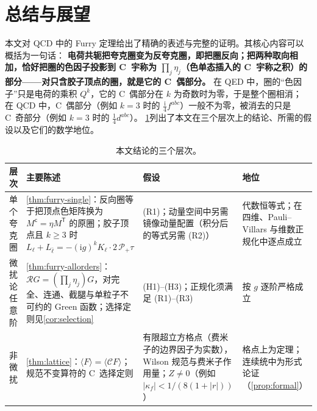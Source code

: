 \documentclass[UTF8,a4paper,11pt,fontset=fandol]{ctexart}
\theoremstyle{cplain}
\theoremstyle{cdefinition}
\theoremstyle{cremark}
\numberwithin{equation}{section}
\newcommand{\tp}{\mathsf{T}}                         %
\newcommand{\Cop}{\mathcal{C}}                       %
\newcommand{\Rop}{\mathcal{R}}                       %
\newcommand{\Pp}{\mathcal{P}_{+}}                    %
\newcommand{\ii}{\mathrm{i}}                        %
\begin{document}
\section{总结与展望}\label{sec:summary}

本文对 QCD 中的 Furry 定理给出了精确的表述与完整的证明。其核心内容可以概括为一句话：
\textbf{\boldmath 电荷共轭把夸克圈变为反夸克圈，即把圈反向；把两种取向相加，恰好把圈的色因子投影到 C~宇称为 $\prod_j\eta_j$（色单态插入的 C~宇称之积）的部分——对只含胶子顶点的圈，就是它的 C~偶部分。}
在 QED 中，圈的“色因子”只是电荷的乘积 $Q^k$，它的 C~偶部分在 $k$ 为奇数时为零，于是整个圈相消；
在 QCD 中，C~偶部分（例如 $k=3$ 时的 $\frac{\ii}{4}f^{abc}$）一般不为零，被消去的只是 C~奇部分（例如 $k=3$ 时的 $\frac14d^{abc}$）。
\cref{tab:summary-levels}列出了本文在三个层次上的结论、所需的假设以及它们的数学地位。

\begin{table}[htbp]
\centering
\caption{本文结论的三个层次。}
\label{tab:summary-levels}
\small
\renewcommand{\arraystretch}{1.25}
\begin{tabularx}{\textwidth}{@{}>{\raggedright\arraybackslash}p{2.2cm}>{\raggedright\arraybackslash}X>{\raggedright\arraybackslash}p{3.6cm}>{\raggedright\arraybackslash}p{3.4cm}@{}}
\toprule
层次 & 主要陈述 & 假设 & 地位\\
\midrule
单个夸克圈 &
\cref{thm:furry-single}：反向圈等于把顶点色矩阵换为 $M^{\mathsf c}=\eta M^{\tp}$ 的原圈；胶子顶点且 $k\ge3$ 时 $L_\ell+L_{\bar\ell}=-(\ii g)^kK_\ell\cdot2\,\Pp\tau$ &
(R1)；动量空间中另需镜像动量配置（积分后的等式另需 (R2)） &
代数恒等式；在四维、Pauli--Villars 与维数正规化中逐点成立\\
微扰论任意阶 &
\cref{thm:furry-allorders}：$\Rop G=(\prod_j\eta_j)G$，对完全、连通、截腿与单粒子不可约的 Green 函数；选择定则见\cref{cor:selection} &
(H1)--(H3)；正规化须满足 (R1)--(R3) &
按 $g$ 逐阶严格成立\\
非微扰 &
\cref{thm:lattice}：$\langle F\rangle=\langle\Cop F\rangle$；规范不变算符的 C~选择定则 &
有限超立方格点（费米子的边界因子为实数），Wilson 规范与费米子作用量；$Z\neq0$（例如 $|\kappa_f|<1/(8(1+|r|))$） &
格点上为定理；连续统中为形式论证（\cref{prop:formal}）\\
\bottomrule
\end{tabularx}
\end{table}
\end{document}

